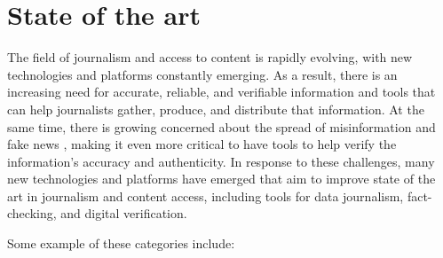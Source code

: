 \documentclass[target=mst,aauheader=]{thud}
\begin{document}
\chapter{State of the art}
\label{chapter:stateOfTheArt}

The field of journalism and access to content is rapidly evolving, with new technologies and platforms constantly emerging. As a result, there is an increasing need for accurate, reliable, and verifiable information and tools that can help journalists gather, produce, and distribute that information. At the same time, there is growing concerned about the spread of misinformation and fake news \cite{DefiningFakeNews}, making it even more critical to have tools to help verify the information's accuracy and authenticity. In response to these challenges, many new technologies and platforms have emerged that aim to improve state of the art in journalism and content access, including tools for data journalism, fact-checking, and digital verification.

Some example of these categories include:
\end{document}
